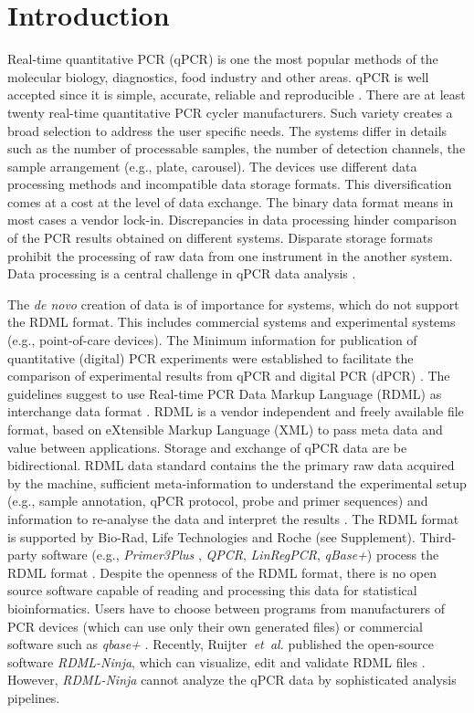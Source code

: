 \documentclass{bioinfo}
\begin{document}
\section{Introduction}
  Real-time quantitative PCR (qPCR) is one the most popular methods of the 
molecular biology, diagnostics, food industry and other areas. qPCR is well 
accepted since it is simple, accurate, reliable and reproducible 
\cite{pabinger_2014}. There are at least twenty real-time quantitative PCR 
cycler manufacturers. Such variety creates a broad selection to address the user 
specific needs. The systems differ in details such as the number of processable 
samples, the number of detection channels, the sample arrangement (e.g., plate, 
carousel). The devices use different data processing methods and incompatible 
data storage formats. This diversification comes at a cost at the level of data 
exchange. The binary data format means in most cases a vendor lock-in. 
Discrepancies in data processing hinder comparison of the PCR results obtained 
on different systems. Disparate storage formats prohibit the processing of raw 
data from one instrument in the another system. Data processing is a central 
challenge in qPCR data analysis \cite{roediger2015r, spiess_impact_2014}.

The \textit{de novo} creation of data is of importance for systems, 
which do not support the RDML format. This includes commercial systems and 
experimental systems (e.g.,  point-of-care devices). The Minimum information for 
publication of quantitative (digital) PCR experiments  were established to 
facilitate the comparison of experimental results from qPCR and digital PCR 
(dPCR) \cite{huggett_2013}. The guidelines suggest to use Real-time PCR Data 
Markup Language (RDML) as interchange data format \cite{rdml-ninja_2015}. RDML 
is a vendor independent and freely available file format, based on eXtensible 
Markup Language (XML) to pass meta data and value between applications. Storage 
and exchange of qPCR data are be bidirectional. RDML data standard contains the 
the primary raw data acquired by the machine, sufficient meta-information to understand the 
experimental setup (e.g., sample annotation, qPCR protocol, probe and primer 
sequences) and information to re-analyse the data and interpret the results 
\cite{lefever_rdml_2009}. The RDML format is supported by Bio-Rad, Life 
Technologies and Roche (see Supplement). Third-party software (e.g., 
\textit{Primer3Plus} \cite{untergasser_2007}, \textit{QPCR}, \textit{LinRegPCR}, 
\textit{qBase+}) process the RDML format \cite{pabinger_2014, rdml-ninja_2015}. 
Despite the openness of the RDML format, there is no open source software 
capable of reading and processing this data for statistical bioinformatics. 
Users have to choose between programs from manufacturers of PCR devices (which 
can use only their own generated files) or commercial software such as 
\textit{qbase+} \cite{pabinger_2014, rdml-ninja_2015}. Recently, 
Ruijter~\textit{et~al.} published the open-source software \textit{RDML-Ninja}, 
which can visualize, edit and validate RDML files \cite{rdml-ninja_2015}. 
However, \textit{RDML-Ninja} cannot analyze the qPCR data by sophisticated 
analysis pipelines. 
\end{document}
